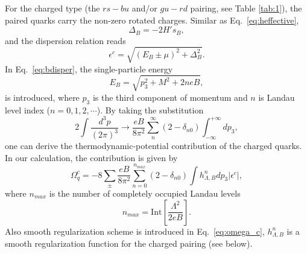 \documentclass[prd, showpacs,nofootinbib,amsmath,amssymb,12pt]{revtex4}
\begin{document}
For the charged type (the $rs-bu$ and/or $gu-rd$ pairing, see Table \ref{tab:1}), the paired quarks carry the non-zero rotated charges.
Similar as Eq.~\ref{eq:heffective},
\begin{equation}
\Delta_B=-2H's_B,
\end{equation}
and the dispersion relation reads
\begin{equation}
\label{eq:bdisper}
    \epsilon^c=\sqrt{(E_B\pm\mu)^2+\Delta_B^2}.
\end{equation}
In Eq.~\eqref{eq:bdisper}, the single-particle energy 
\begin{equation}
\label{eq:energyb}
E_B=\sqrt{p^2_3+M^2 + 2neB},
\end{equation}
is introduced, where $p_3$ is the third component of momentum  and $n$ is Landau level index ($n=0, 1, 2, \cdots$).
By taking the substitution
\begin{equation}
2\int\frac{d^3p}{(2\pi)^3}\rightarrow\frac{eB}{8\pi^2}\sum^{\infty}_n(2-\delta_{n0})\int^{+\infty}_{-\infty} dp_3,
\label{eq:momentumsub}
\end{equation}
one can derive the thermodynamic-potential contribution of the charged quarks.
In our calculation, the contribution is given by
\begin{equation}
\Omega^c_q=-8\sum_{\pm}\frac{eB}{8\pi^2}\sum_{n=0}^{n_{max}} (2 -\delta_{n0}) \int h^n_{\Lambda,B} dp_3|\epsilon^c|, 
\label{eq:omega_c}
\end{equation}
where $n_{max}$ is the number of completely occupied Landau levels 
\begin{equation}\label{eq:nmax}
  n_{max}= \text{Int}[\frac{\Lambda^2}{2eB}].
\end{equation}
Also smooth regularization scheme is introduced in Eq.~\eqref{eq:omega_c}, $h^n_{\Lambda, B}$ is a smooth regularization function for the charged pairing (see below).
\end{document}
